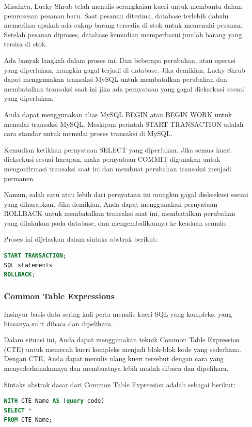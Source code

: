 \documentclass{article}
\begin{document}
Misalnya, Lucky Shrub telah menulis serangkaian kueri untuk membantu dalam pemrosesan pesanan baru. Saat pesanan diterima, database terlebih dahulu memeriksa apakah ada cukup barang tersedia di stok untuk memenuhi pesanan. Setelah pesanan diproses, database kemudian memperbarui jumlah barang yang tersisa di stok.

Ada banyak langkah dalam proses ini. Dan beberapa perubahan, atau operasi yang diperlukan, mungkin gagal terjadi di database. Jika demikian, Lucky Shrub dapat menggunakan transaksi MySQL untuk membatalkan perubahan dan membatalkan transaksi saat ini jika ada pernyataan yang gagal dieksekusi sesuai yang diperlukan.

Anda dapat menggunakan alias MySQL BEGIN atau BEGIN WORK untuk memulai transaksi MySQL. Meskipun perintah START TRANSACTION adalah cara standar untuk memulai proses transaksi di MySQL.

Kemudian ketikkan pernyataan SELECT yang diperlukan. Jika semua kueri dieksekusi sesuai harapan, maka pernyataan COMMIT digunakan untuk mengonfirmasi transaksi saat ini dan membuat perubahan transaksi menjadi permanen.

Namun, salah satu atau lebih dari pernyataan ini mungkin gagal dieksekusi sesuai yang diharapkan. Jika demikian, Anda dapat menggunakan pernyataan ROLLBACK untuk membatalkan transaksi saat ini, membatalkan perubahan yang dilakukan pada database, dan mengembalikannya ke keadaan semula.

Proses ini dijelaskan dalam sintaks abstrak berikut:
\begin{lstlisting}[language=SQL, caption={}, captionpos=b]
START TRANSACTION; 
SQL statements 
ROLLBACK; 
\end{lstlisting}

\subsubsection{Common Table Expressions}
Insinyur basis data sering kali perlu menulis kueri SQL yang kompleks, yang biasanya sulit dibaca dan dipelihara.

Dalam situasi ini, Anda dapat menggunakan teknik Common Table Expression (CTE) untuk memecah kueri kompleks menjadi blok-blok kode yang sederhana. Dengan CTE, Anda dapat menulis ulang kueri tersebut dengan cara yang menyederhanakannya dan membuatnya lebih mudah dibaca dan dipelihara.

Sintaks abstrak dasar dari Common Table Expression adalah sebagai berikut:
\begin{lstlisting}[language=SQL, caption={}, captionpos=b]
WITH CTE_Name AS (query code)  
SELECT * 
FROM CTE_Name; 
\end{lstlisting}
\end{document}
